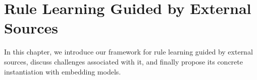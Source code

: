 


\chapter{Rule Learning Guided by External Sources}
\label{sec:framework}

In this chapter, we introduce our framework for rule learning guided by external sources,
discuss challenges associated with it, and finally propose its concrete instantiation with embedding models.

%
%
%
%
%

